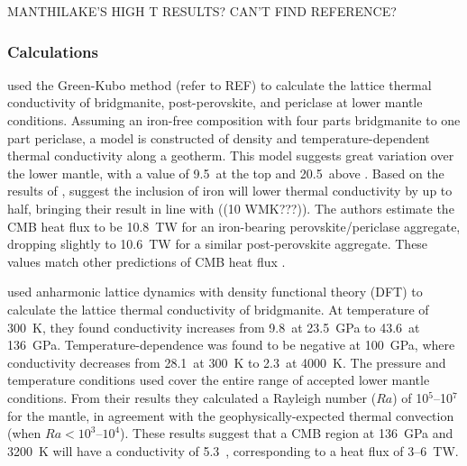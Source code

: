 MANTHILAKE'S HIGH T RESULTS? CAN'T FIND REFERENCE?

\subsubsection{Calculations}


\citet{Haigis2012} used the Green-Kubo method (refer to REF) to calculate the lattice thermal conductivity of bridgmanite, post-perovskite, and periclase at lower mantle conditions. Assuming an iron-free composition with four parts bridgmanite to one part periclase, a model is constructed of density and temperature-dependent thermal conductivity along a geotherm. This model suggests great variation over the lower mantle, with a value of 9.5~\wmks at the top and 20.5~\wmks above \ddd. Based on the results of \citet{Manthilake2011}, \citeauthor{Haigis2012} suggest the inclusion of iron will lower thermal conductivity by up to half, bringing their result in line with \citet{Lay2006} ((10 WMK???)). The authors estimate the CMB heat flux to be 10.8~TW for an iron-bearing perovskite/periclase aggregate, dropping slightly to 10.6~TW for a similar post-perovskite aggregate. These values match other predictions of CMB heat flux \citep[e.g.][]{Lay2008}.

\citet{Dekura2013} used \ais anharmonic lattice dynamics with density functional theory (DFT) to calculate the lattice thermal conductivity of bridgmanite. At temperature of 300~K, they found conductivity increases from 9.8~\wmks at 23.5~GPa to 43.6~\wmks at 136~GPa. Temperature-dependence was found to be negative at 100~GPa, where conductivity decreases from 28.1~\wmks at 300~K to 2.3~\wmks at 4000~K. The pressure and temperature conditions used cover the entire range of accepted lower mantle conditions. From their results they calculated a Rayleigh number ($Ra$) of 10$^5$--10$^7$ for the mantle, in agreement with the geophysically-expected thermal convection (when $Ra < 10^3$--$10^4$). These results suggest that a CMB region at 136~GPa and 3200~K will have a conductivity of 5.3~\wmk, corresponding to a heat flux of 3--6~TW.

